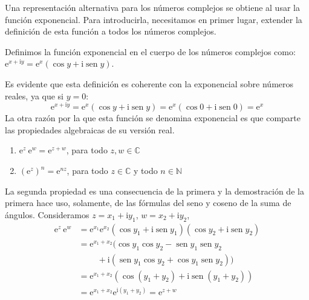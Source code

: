 Una representación alternativa para los números complejos se obtiene al usar la función exponencial.
Para introducirla, necesitamos en primer lugar, extender la definición de esta función a todos los números complejos.
%
\begin{definicion}
Definimos la función exponencial en el cuerpo de los números complejos como:\quad
$\mathrm{e}^{x+\mathrm{i} y} = \mathrm{e}^x(\cos y + \mathrm{i} \operatorname{sen} y)$.
\end{definicion}
%
Es evidente que esta definición es coherente con la exponencial sobre números reales, ya que si $y=0$:
\[
\mathrm{e}^{x+\mathrm{i} y}=\mathrm{e}^x(\cos y + \mathrm{i} \operatorname{sen} y) = \mathrm{e}^x(\cos 0 + \mathrm{i} \operatorname{sen} 0) = \mathrm{e}^x
\]
La otra razón por la que esta función se denomina exponencial es que comparte las propiedades algebraicas de su versión real.
%
\begin{proposicion-br}\label{pr:exp}
\begin{enumerate}
\item
$\mathrm{e}^z\ \mathrm{e}^w = \mathrm{e}^{z+w}$, para todo $z,w\in\mathbb{C}$
\item
$(\mathrm{e}^z)^n = \mathrm{e}^{nz}$, para todo $z\in\mathbb{C}$ y todo $n\in\mathbb{N}$
\end{enumerate}
\end{proposicion-br}
%
La segunda propiedad es una consecuencia de la primera y la demostración de la primera hace uso, solamente, de las fórmulas del seno y coseno de la suma de ángulos.
Consideramos $z=x_1+\mathrm{i} y_1$, $w=x_2+ \mathrm{i} y_2$, 
\begin{align*}
\mathrm{e}^z\ \mathrm{e}^w  &=\mathrm{e}^{x_1}\mathrm{e}^{x_2} (\cos y_1 + \mathrm{i}\operatorname{sen} y_1)(\cos y_2 + \mathrm{i}\operatorname{sen} y_2)\\
 &=\mathrm{e}^{x_1+x_2} (\cos y_1\cos y_2 - \operatorname{sen} y_1\operatorname{sen} y_2\\
&\ \qquad + \mathrm{i}(\operatorname{sen} y_1 \cos y_2 + \cos y_1
\operatorname{sen} y_2))\\
 &= \mathrm{e}^{x_1+x_2} (\cos( y_1 +  y_2) + \mathrm{i} \operatorname{sen}( y_1 +  y_2))\\
 & = \mathrm{e}^{x_1+x_2} \mathrm{e}^{\mathrm{i}( y_1+ y_2)} = \mathrm{e}^{z+w}
\end{align*}

